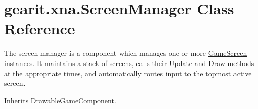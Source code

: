 \hypertarget{classgearit_1_1xna_1_1_screen_manager}{\section{gearit.\+xna.\+Screen\+Manager Class Reference}
\label{classgearit_1_1xna_1_1_screen_manager}
}


The screen manager is a component which manages one or more \hyperlink{classgearit_1_1xna_1_1_game_screen}{Game\+Screen} instances. It maintains a stack of screens, calls their Update and Draw methods at the appropriate times, and automatically routes input to the topmost active screen.  




Inherits Drawable\+Game\+Component.

